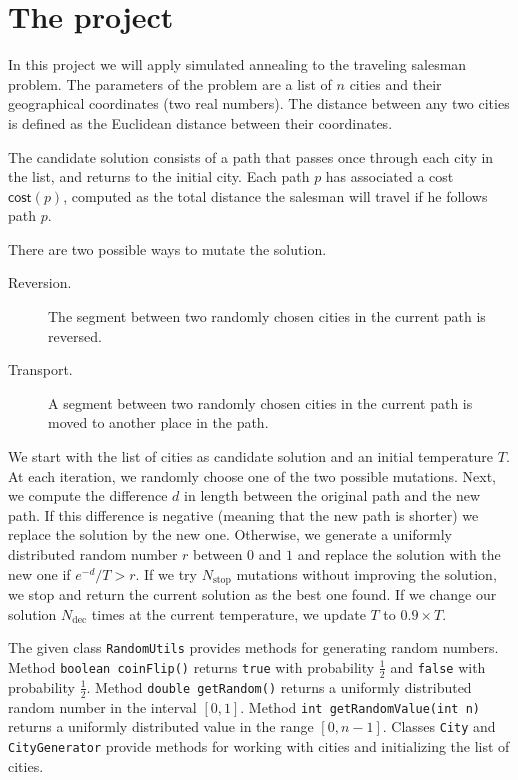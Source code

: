 \documentclass[a4paper]{article}
\newcommand{\cost}{\mathsf{cost}}
\begin{document}
\section*{The project}

In this project we will apply simulated annealing to the traveling salesman problem. The parameters
of the problem are a list of $n$ cities and their geographical coordinates (two real numbers). The
distance between any two cities is defined as the Euclidean distance between their coordinates.

The candidate solution consists of a path that passes once through each city in the list, and
returns to the initial city. Each path $p$ has associated a cost $\cost(p)$, computed as the total
distance the salesman will travel if he follows path $p$.

There are two possible ways to mutate the solution.
\begin{description}
\item[Reversion.] The segment between two randomly chosen cities in the current path is reversed.
\item[Transport.] A segment between two randomly chosen cities in the current path is moved to
  another place in the path.
\end{description}

We start with the list of cities as candidate solution and an initial temperature $T$. At each
iteration, we randomly choose one of the two possible mutations. Next, we compute the difference $d$
in length between the original path and the new path. If this difference is negative (meaning that
the new path is shorter) we replace the solution by the new one. Otherwise, we generate a uniformly
distributed random number $r$ between $0$ and $1$ and replace the solution with the new one if
$e^{-d}/T > r$. If we try $N_{\mathrm{stop}}$ mutations without improving the solution, we stop and
return the current solution as the best one found. If we change our solution $N_{\mathrm{dec}}$
times at the current temperature, we update $T$ to $0.9\times T$.

The given class \verb!RandomUtils! provides methods for generating random numbers. Method
\verb!boolean coinFlip()! returns \verb!true! with probability $\frac12$ and \verb!false! with
probability $\frac12$. Method \verb!double getRandom()! returns a uniformly distributed random
number in the interval $[0,1]$. Method \verb!int getRandomValue(int n)! returns a uniformly
distributed value in the range $[0,n-1]$. Classes \verb!City! and \verb!CityGenerator! provide
methods for working with cities and initializing the list of cities.
\end{document}
